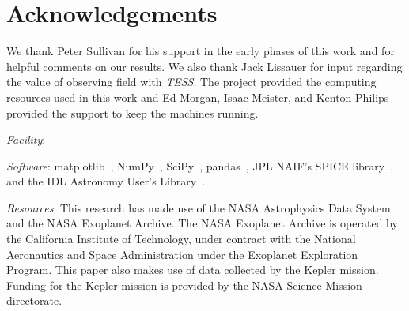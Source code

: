 \section*{Acknowledgements}
We thank Peter Sullivan for his support in the early phases of this 
work and for helpful comments on our results.
We also thank Jack Lissauer for input regarding the value of observing \keplers 
field with \textit{TESS}.
The \tess project provided the computing resources used in this work and Ed Morgan, Isaac Meister, and Kenton Philips provided the support to keep the machines running.

\vspace{0.5cm}
\textit{Facility}: \tess

\textit{Software}: matplotlib~\citep{hunter_matplotlib_2007}, NumPy~\citep{walt_numpy_2011}, SciPy~\citep{jones_scipy_2001}, pandas~\citep{mckinneypandas}, JPL NAIF's SPICE library~\citep{acton_SPICE_1996}, and the IDL Astronomy User's Library~\citep{landsman_idl_1995}.

\textit{Resources}: This research has made use of the NASA Astrophysics Data System and the NASA Exoplanet Archive. The NASA Exoplanet Archive is operated by the California Institute of Technology, under contract with the National Aeronautics and Space Administration under the Exoplanet Exploration Program.
This paper also makes use of data collected by the Kepler mission. Funding for the Kepler mission is provided by the NASA Science Mission directorate.
